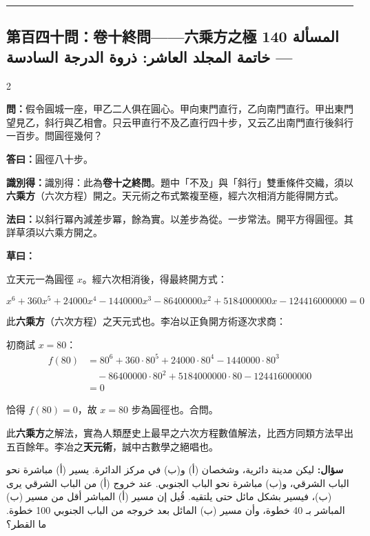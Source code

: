 \documentclass[11pt,a4paper]{article}
\newcommand{\ar}[1]{\arabicfont\beginR #1\endR}
\newcommand{\arb}[1]{\textbf{\arabicfont\beginR #1\endR}}
\newcommand{\longline}{\noindent\rule{\textwidth}{0.4pt}}
\newcommand{\arnote}[1]{\textcolor{arabicblue}{\ar{#1}}}
\newcommand{\wen}[1]{\par\noindent\textbf{\textcolor{probcolor}{問：}}{#1}\par}
\newcommand{\da}[1]{\par\noindent\textbf{\textcolor{anscolor}{答曰：}}{#1}\par}
\newcommand{\fayue}[1]{\par\noindent\textbf{\textcolor{methodcolor}{法曰：}}{#1}\par}
\newcommand{\caoyue}[1]{\par\noindent\textbf{草曰：}{#1}\par}
\newcommand{\zhi}[1]{\par\noindent\textbf{識別得：}{#1}\par}
\newcommand{\arwen}[1]{\par\noindent\arb{سؤال: }\arnote{#1}\par}
\begin{document}
\vspace{0.3cm}
\longline

\subsection*{第百四十問：卷十終問——六乘方之極 \hfill \ar{المسألة 140 — خاتمة المجلد العاشر: ذروة الدرجة السادسة}}

\begin{paracol}{2}

\begin{leftcolumn}
\wen{假令圓城一座，甲乙二人俱在圓心。甲向東門直行，乙向南門直行。甲出東門望見乙，斜行與乙相會。只云甲直行不及乙直行四十步，又云乙出南門直行後斜行一百步。問圓徑幾何？}

\da{圓徑八十步。}

\zhi{識別得：此為\textbf{卷十之終問}。題中「不及」與「斜行」雙重條件交織，須以\textbf{六乘方}（六次方程）開之。天元術之布式繁複至極，經六次相消方能得開方式。}

\fayue{以斜行冪內減差步冪，餘為實。以差步為從。一步常法。開平方得圓徑。其詳草須以六乘方開之。}

\caoyue{
立天元一為圓徑 $x$。經六次相消後，得最終開方式：

$$x^6 + 360x^5 + 24000x^4 - 1440000x^3 - 86400000x^2 + 5184000000x - 124416000000 = 0$$

此\textbf{六乘方}（六次方程）之天元式也。李冶以正負開方術逐次求商：

初商試 $x = 80$：
\begin{align*}
f(80) &= 80^6 + 360 \cdot 80^5 + 24000 \cdot 80^4 - 1440000 \cdot 80^3 \\
&\quad - 86400000 \cdot 80^2 + 5184000000 \cdot 80 - 124416000000 \\
&= 0
\end{align*}

恰得 $f(80) = 0$，故 $x = 80$ 步為圓徑也。合問。

此\textbf{六乘方}之解法，實為人類歷史上最早之六次方程數值解法，比西方同類方法早出五百餘年。李冶之\textbf{天元術}，誠中古數學之絕唱也。}
\end{leftcolumn}

\begin{rightcolumn}
\arwen{ليكن مدينة دائرية، وشخصان (أ) و(ب) في مركز الدائرة. يسير (أ) مباشرة نحو الباب الشرقي، و(ب) مباشرة نحو الباب الجنوبي. عند خروج (أ) من الباب الشرقي يرى (ب)، فيسير بشكل مائل حتى يلتقيه. قُيل إن مسير (أ) المباشر أقل من مسير (ب) المباشر بـ 40 خطوة، وأن مسير (ب) المائل بعد خروجه من الباب الجنوبي 100 خطوة. ما القطر؟}


\end{rightcolumn}
\end{paracol}
\end{document}
